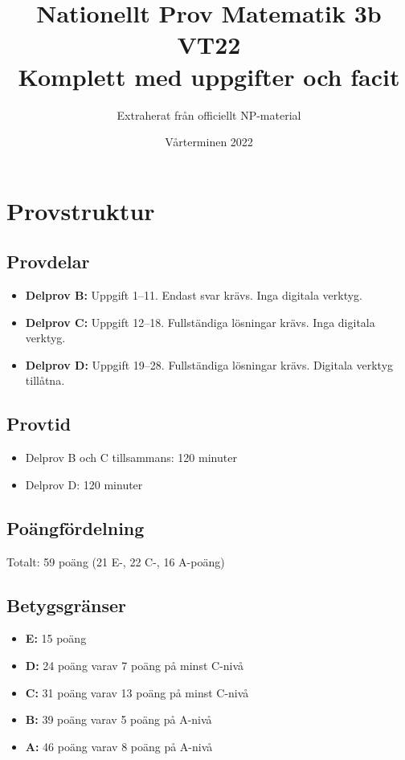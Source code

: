 \documentclass{article}
\title{Nationellt Prov Matematik 3b VT22 \\ \large Komplett med uppgifter och facit}
\author{Extraherat från officiellt NP-material}
\date{Vårterminen 2022}
\begin{document}
\maketitle

\tableofcontents
\newpage

\section{Provstruktur}

\subsection*{Provdelar}
\begin{itemize}
    \item \textbf{Delprov B:} Uppgift 1--11. Endast svar krävs. Inga digitala verktyg.
    \item \textbf{Delprov C:} Uppgift 12--18. Fullständiga lösningar krävs. Inga digitala verktyg.
    \item \textbf{Delprov D:} Uppgift 19--28. Fullständiga lösningar krävs. Digitala verktyg tillåtna.
\end{itemize}

\subsection*{Provtid}
\begin{itemize}
    \item Delprov B och C tillsammans: 120 minuter
    \item Delprov D: 120 minuter
\end{itemize}

\subsection*{Poängfördelning}
Totalt: 59 poäng (21 E-, 22 C-, 16 A-poäng)

\subsection*{Betygsgränser}
\begin{itemize}
    \item \textbf{E:} 15 poäng
    \item \textbf{D:} 24 poäng varav 7 poäng på minst C-nivå
    \item \textbf{C:} 31 poäng varav 13 poäng på minst C-nivå
    \item \textbf{B:} 39 poäng varav 5 poäng på A-nivå
    \item \textbf{A:} 46 poäng varav 8 poäng på A-nivå
\end{itemize}
\end{document}
